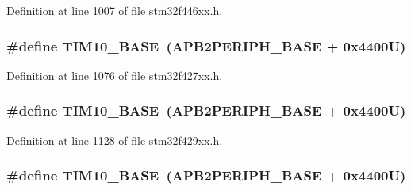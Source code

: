 Definition at line 1007 of file stm32f446xx.\+h.

\subsubsection[{\texorpdfstring{T\+I\+M10\+\_\+\+B\+A\+SE}{TIM10_BASE}}]{\setlength{\rightskip}{0pt plus 5cm}\#define T\+I\+M10\+\_\+\+B\+A\+SE~({\bf A\+P\+B2\+P\+E\+R\+I\+P\+H\+\_\+\+B\+A\+SE} + 0x4400\+U)}\hypertarget{group___peripheral__memory__map_ga3eff32f3801db31fb4b61d5618cad54a}{}\label{group___peripheral__memory__map_ga3eff32f3801db31fb4b61d5618cad54a}


Definition at line 1076 of file stm32f427xx.\+h.

\subsubsection[{\texorpdfstring{T\+I\+M10\+\_\+\+B\+A\+SE}{TIM10_BASE}}]{\setlength{\rightskip}{0pt plus 5cm}\#define T\+I\+M10\+\_\+\+B\+A\+SE~({\bf A\+P\+B2\+P\+E\+R\+I\+P\+H\+\_\+\+B\+A\+SE} + 0x4400\+U)}\hypertarget{group___peripheral__memory__map_ga3eff32f3801db31fb4b61d5618cad54a}{}\label{group___peripheral__memory__map_ga3eff32f3801db31fb4b61d5618cad54a}


Definition at line 1128 of file stm32f429xx.\+h.

\subsubsection[{\texorpdfstring{T\+I\+M10\+\_\+\+B\+A\+SE}{TIM10_BASE}}]{\setlength{\rightskip}{0pt plus 5cm}\#define T\+I\+M10\+\_\+\+B\+A\+SE~({\bf A\+P\+B2\+P\+E\+R\+I\+P\+H\+\_\+\+B\+A\+SE} + 0x4400\+U)}\hypertarget{group___peripheral__memory__map_ga3eff32f3801db31fb4b61d5618cad54a}{}\label{group___peripheral__memory__map_ga3eff32f3801db31fb4b61d5618cad54a}


